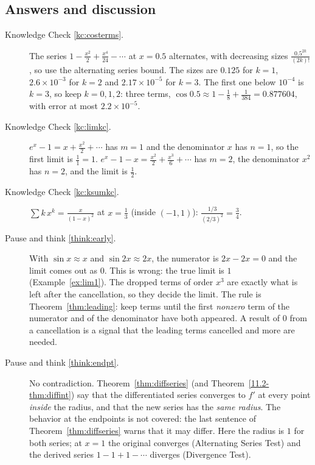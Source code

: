 \documentclass[11pt]{article}
\begin{document}
\subsection*{Answers and discussion}

\begin{description}
  \item[Knowledge Check \ref{kc:costerms}.] The series $1-\frac{x^2}2+\frac{x^4}{24}-\cdots$ at $x=0.5$ alternates, with decreasing sizes $\frac{0.5^{2k}}{(2k)!}$, so use the alternating series bound. The sizes are $0.125$ for $k=1$, $2.6\times10^{-3}$ for $k=2$ and $2.17\times10^{-5}$ for $k=3$. The first one below $10^{-4}$ is $k=3$, so keep $k=0,1,2$: three terms, $\cos0.5\approx1-\frac18+\frac1{384}=0.877604$, with error at most $2.2\times10^{-5}$.
  \item[Knowledge Check \ref{kc:limkc}.] $e^x-1=x+\frac{x^2}2+\cdots$ has $m=1$ and the denominator $x$ has $n=1$, so the first limit is $\frac11=1$. $e^x-1-x=\frac{x^2}2+\frac{x^3}6+\cdots$ has $m=2$, the denominator $x^2$ has $n=2$, and the limit is $\frac12$.
  \item[Knowledge Check \ref{kc:ksumkc}.] $\sum k\,x^k=\frac x{(1-x)^2}$ at $x=\frac13$ (inside $(-1,1)$): $\frac{1/3}{(2/3)^2}=\frac34$.
  \item[Pause and think \ref{think:early}.] With $\sin x\approx x$ and $\sin2x\approx2x$, the numerator is $2x-2x=0$ and the limit comes out as $0$. This is wrong: the true limit is $1$ (Example~\ref{ex:lim1}). The dropped terms of order $x^3$ are exactly what is left after the cancellation, so they decide the limit. The rule is Theorem~\ref{thm:leading}: keep terms until the first \emph{nonzero} term of the numerator and of the denominator have both appeared. A result of $0$ from a cancellation is a signal that the leading terms cancelled and more are needed.
  \item[Pause and think \ref{think:endpt}.] No contradiction. Theorem~\ref{thm:diffseries} (and Theorem~\ref{11.2-thm:diffint}) say that the differentiated series converges to $f'$ at every point \emph{inside} the radius, and that the new series has the \emph{same radius}. The behavior at the endpoints is not covered: the last sentence of Theorem~\ref{thm:diffseries} warns that it may differ. Here the radius is $1$ for both series; at $x=1$ the original converges (Alternating Series Test) and the derived series $1-1+1-\cdots$ diverges (Divergence Test).

\end{description}
\end{document}
